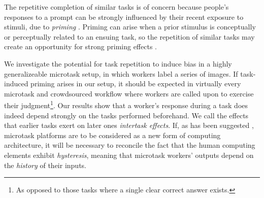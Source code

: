\documentclass[12pt]{article}
\begin{document}

The repetitive completion of similar tasks is of concern because people's 
responses to a prompt can be strongly influenced by their recent exposure to 
stimuli, due to \textit{priming} 
\cite{BJOP1796}. %
Priming can arise when 
a prior stimulus is conceptually or perceptually related to an ensuing 
task, so the repetition of 
similar tasks may create an opportunity for strong priming effects
\cite{Gass1999549}. %


We investigate the potential for task repetition to induce bias in 
a highly generalizeable microtask setup, in which workers label a 
series of images.  If task-induced priming arises in our setup, 
it should be expected in virtually every microtask and crowdsourced workflow
where workers are called upon to exercise their judgment\footnote{
	As opposed to those tasks where a single clear correct answer exists.
}.
Our results show that a worker's response during a task
does indeed depend strongly on the tasks performed beforehand.   
We call the effects that earlier tasks exert on later ones 
\textit{intertask effects}.  If, as has been suggested \cite{5543192}, 
microtask platforms are to be considered as a new form of computing 
architecture, it will be necessary to reconcile the fact that the human 
computing elements 
exhibit \textit{hysteresis}, meaning that microtask workers' outputs depend 
on the \textit{history} of their inputs.
\end{document}
